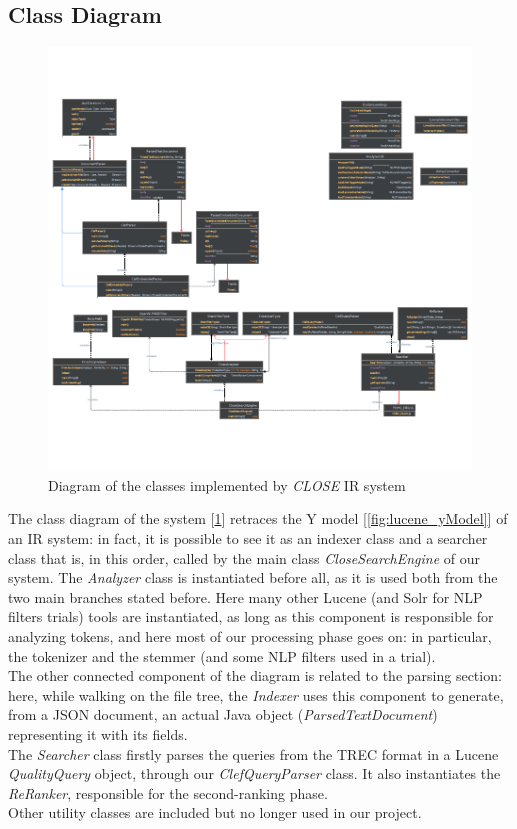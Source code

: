 \newpage
\enlargethispage{5\baselineskip}
\subsection{Class Diagram}

\begin{figure}[!h]
    \centering
    \includegraphics[height=0.7\textheight, angle =90, keepaspectratio]{figure/Classes_diagram_white_crop.pdf}
    \caption{Diagram of the classes implemented by \textit{CLOSE} \ac{IR} system}
    \label{fig:Classes_diagram_white}
\end{figure}
\clearpage
The class diagram of the system [\ref{fig:Classes_diagram_white}] retraces the Y model [\ref{fig:lucene_yModel}] of an IR system: in fact, it is possible to see it as an indexer class and a searcher class that is, in this order,
called by the main class \textit{CloseSearchEngine} of our system. The \textit{Analyzer} class is instantiated before all, as it is used both from the two main branches stated before. Here many other Lucene (and Solr for NLP filters trials) tools are instantiated, as long as this component
is responsible for analyzing tokens, and here most of our processing phase goes on: in particular, the tokenizer and the stemmer (and some NLP filters used in a trial).\\
The other connected component of the diagram is related to the parsing section: here, while walking on the file tree, the \textit{Indexer} uses this component to generate, from a JSON document, an actual Java object (\textit{ParsedTextDocument}) representing it with its fields.\\
The \textit{Searcher} class firstly parses the queries from the \ac{TREC} format in a Lucene \textit{QualityQuery} object, through our \textit{ClefQueryParser} class. It also instantiates the \textit{ReRanker}, responsible for the second-ranking phase.\\
Other utility classes are included but no longer used in our project.

